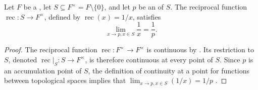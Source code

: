 \begin{corollary} \label{corollary:limit_of_reciprocal_function_on_topological_field_at_accumulation_point}
    Let $F$ be a , let $S \subseteq F^\times = F \setminus \{0\}$, and let $p$ be an  of $S$. The reciprocal function $\operatorname{rec} : S \to F^\times$, defined by $\operatorname{rec}(x) = 1/x$, satisfies
    $$\lim_{x \to p, x \in S} \frac{1}{x} = \frac{1}{p}.$$
\end{corollary}
\begin{proof}
    The reciprocal function $\operatorname{rec} : F^\times \to F^\times$ is continuous by . Its restriction to $S$, denoted $\operatorname{rec}|_S : S \to F^\times$, is therefore continuous at every point of $S$. Since $p$ is an accumulation point of $S$, the definition of continuity at a point for functions between topological spaces implies that $\lim_{x \to p, x \in S} (1/x) = 1/p$ .
\end{proof}
